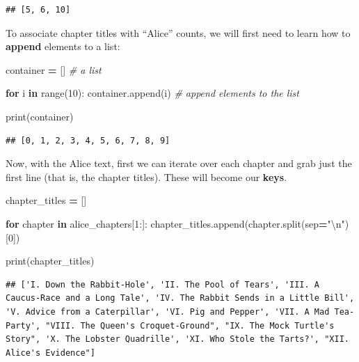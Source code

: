 \documentclass[]{book}
\newenvironment{Shaded}{\begin{snugshade}}{\end{snugshade}}
\newcommand{\BuiltInTok}[1]{#1}
\newcommand{\CharTok}[1]{\textcolor[rgb]{0.31,0.60,0.02}{#1}}
\newcommand{\CommentTok}[1]{\textcolor[rgb]{0.56,0.35,0.01}{\textit{#1}}}
\newcommand{\ControlFlowTok}[1]{\textcolor[rgb]{0.13,0.29,0.53}{\textbf{#1}}}
\newcommand{\DecValTok}[1]{\textcolor[rgb]{0.00,0.00,0.81}{#1}}
\newcommand{\KeywordTok}[1]{\textcolor[rgb]{0.13,0.29,0.53}{\textbf{#1}}}
\newcommand{\NormalTok}[1]{#1}
\newcommand{\OperatorTok}[1]{\textcolor[rgb]{0.81,0.36,0.00}{\textbf{#1}}}
\newcommand{\StringTok}[1]{\textcolor[rgb]{0.31,0.60,0.02}{#1}}
\begin{document}
\begin{verbatim}
## [5, 6, 10]
\end{verbatim}

To associate chapter titles with ``Alice'' counts, we will first need to learn how to \textbf{append} elements to a list:

\begin{Shaded}
\begin{Highlighting}[]
\NormalTok{container }\OperatorTok{=}\NormalTok{ [] }\CommentTok{# a list}

\ControlFlowTok{for}\NormalTok{ i }\KeywordTok{in} \BuiltInTok{range}\NormalTok{(}\DecValTok{10}\NormalTok{):}
\NormalTok{    container.append(i) }\CommentTok{# append elements to the list}

\BuiltInTok{print}\NormalTok{(container)    }
\end{Highlighting}
\end{Shaded}

\begin{verbatim}
## [0, 1, 2, 3, 4, 5, 6, 7, 8, 9]
\end{verbatim}

Now, with the Alice text, first we can iterate over each chapter and grab just the first line (that is, the chapter titles). These will become our \textbf{keys}.

\begin{Shaded}
\begin{Highlighting}[]
\NormalTok{chapter_titles }\OperatorTok{=}\NormalTok{ []}

\ControlFlowTok{for}\NormalTok{ chapter }\KeywordTok{in}\NormalTok{ alice_chapters[}\DecValTok{1}\NormalTok{:]:}
\NormalTok{    chapter_titles.append(chapter.split(sep}\OperatorTok{=}\StringTok{"}\CharTok{\textbackslash{}n}\StringTok{"}\NormalTok{)[}\DecValTok{0}\NormalTok{])}

\BuiltInTok{print}\NormalTok{(chapter_titles)}
\end{Highlighting}
\end{Shaded}

\begin{verbatim}
## ['I. Down the Rabbit-Hole', 'II. The Pool of Tears', 'III. A Caucus-Race and a Long Tale', 'IV. The Rabbit Sends in a Little Bill', 'V. Advice from a Caterpillar', 'VI. Pig and Pepper', 'VII. A Mad Tea-Party', "VIII. The Queen's Croquet-Ground", "IX. The Mock Turtle's Story", 'X. The Lobster Quadrille', 'XI. Who Stole the Tarts?', "XII. Alice's Evidence"]
\end{verbatim}
\end{document}
